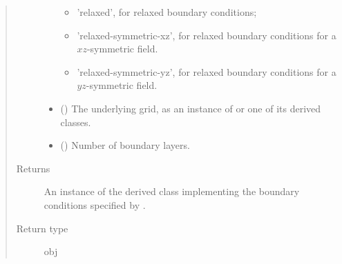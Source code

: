 \documentclass[letterpaper,10pt,english]{sphinxmanual}
\begin{document}
\begin{fulllineitems}
\begin{fulllineitems}
\begin{quote}
\begin{description}
\begin{itemize}
\begin{itemize}
\item {} 
’relaxed’, for relaxed boundary conditions;

\item {} 
’relaxed-symmetric-xz’, for relaxed boundary conditions for a \(xz\)-symmetric field.

\item {} 
’relaxed-symmetric-yz’, for relaxed boundary conditions for a \(yz\)-symmetric field.

\end{itemize}


\item {} 
 () \textendash{} The underlying grid, as an instance of {\hyperref[\detokenize{api:grids.grid_xyz.GridXYZ}]{}} or one of its derived classes.

\item {} 
 () \textendash{} Number of boundary layers.

\end{itemize}

\item[{Returns}] \leavevmode
An instance of the derived class implementing the boundary conditions specified by
.

\item[{Return type}] \leavevmode
obj

\end{description}\end{quote}

\end{fulllineitems}



\end{fulllineitems}
\end{document}
